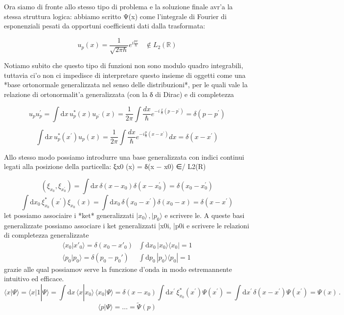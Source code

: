 Ora siamo di fronte allo stesso tipo di problema e la soluzione finale avr'a la stessa struttura logica: abbiamo scritto Ψ(x) come l'integrale di Fourier di esponenziali pesati da opportuni coefficienti dati dalla trasformata:

$$u_{p}(x)={\frac{1}{\sqrt{2\pi\hbar}}}e^{i{\frac{p x}{\hbar}}}\ \ \ \ \notin L_{2}(\mathbb{R})$$

Notiamo subito che questo tipo di funzioni non sono modulo quadro integrabili, tuttavia ci'o non ci impedisce di interpretare questo insieme di oggetti come una *base ortonormale generalizzata nel senso delle distribuzioni*, per le quali vale la relazione di ortonormalit'a generalizzata (con la δ di Dirac) e di completezza

$$u_{p}u_{p}^{\prime}=\int\mathrm{d}x\,u_{p}^{*}(x)u_{p^{\prime}}(x)=\frac{1}{2\pi}\int\frac{d x}{\hbar}e^{-i\,\frac{x}{\hbar}(p-p^{\prime})}=\delta(p-p^{\prime})$$

$$\int\mathrm{d}x\,u_{p}^{*}(x^{\prime})u_{p}(x)=\frac{1}{2\pi}\int\frac{d x}{\hbar}e^{-i\frac{p}{\hbar}(x-x^{\prime})}d x=\delta(x-x^{\prime})$$

Allo stesso modo possiamo introdurre una base generalizzata con indici continui legati alla posizione della particella: ξx0
(x) = δ(x − x0) ∈/ L2(R)

$$(\xi_{x_{0}},\xi_{x_{0}^{\prime}})=\int\mathrm{d}x\,\delta(x-x_{0})\delta(x-x_{0}^{\prime})=\delta(x_{0}-x_{0}^{\prime})$$
$$\int\mathrm{d}x_{0}\,\xi_{x_{0}}^{*}(x^{\prime})\xi_{x_{0}}(x)=\int\mathrm{d}x_{0}\,\delta(x_{0}-x^{\prime})\delta(x_{0}-x)=\delta(x-x^{\prime})$$  let possiamo associaire i *ket* generalizzati $|x_{0}\rangle\,,|p_{0}\rangle$ e scrivere le. 
A queste basi generalizzate possiamo associare i ket generalizzati |x0i, |p0i e scrivere le relazioni di completezza
generalizzate $$\begin{matrix}\langle x_0|x'_0\rangle=\delta(x_0-x'_0)&\int\mathrm{d}x_0\,|x_0\rangle\langle x_0|=1\\ \langle p_0|p_0\rangle=\delta(p_0-p_0')&\int\mathrm{d}p_0\,|p_0\rangle\langle p_0|=1\end{matrix}$$ grazie alle qual possiamov serve la funczione d'onda in modo estremannente intuitivo ed efficace. 
$$\langle x|\Psi\rangle=\langle x|1|\Psi\rangle=\int\mathrm{d}x\,\langle x|x_{0}\rangle\,\langle x_{0}|\Psi\rangle=\delta(x-x_{0})\int\mathrm{d}x^{\prime}\,\xi_{x_{0}}^{*}(x^{\prime})\Psi(x^{\prime})=\int\mathrm{d}x^{\prime}\,\delta(x-x^{\prime})\Psi(x^{\prime})=\Psi(x)\,.$$
$$\langle p|\Psi\rangle=\ldots={\tilde{\Psi}}(p)$$

